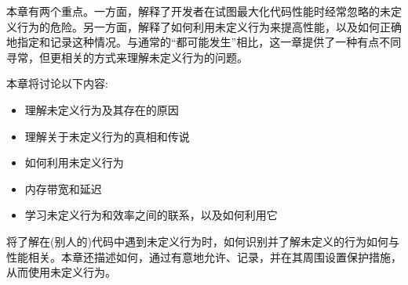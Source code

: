 本章有两个重点。一方面，解释了开发者在试图最大化代码性能时经常忽略的未定义行为的危险。另一方面，解释了如何利用未定义行为来提高性能，以及如何正确地指定和记录这种情况。与通常的“都可能发生”相比，这一章提供了一种有点不同寻常，但更相关的方式来理解未定义行为的问题。

本章将讨论以下内容:

\begin{itemize}
\item 
理解未定义行为及其存在的原因

\item 
理解关于未定义行为的真相和传说

\item 
如何利用未定义行为

\item 
内存带宽和延迟

\item 
学习未定义行为和效率之间的联系，以及如何利用它
\end{itemize}

将了解在(别人的)代码中遇到未定义行为时，如何识别并了解未定义的行为如何与性能相关。本章还描述如何，通过有意地允许、记录，并在其周围设置保护措施，从而使用未定义行为。
